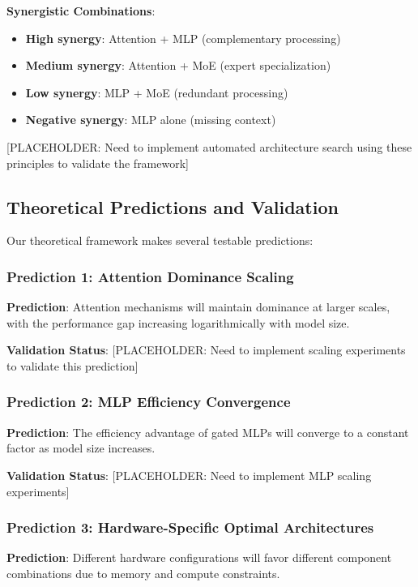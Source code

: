 \documentclass[11pt,a4paper]{article}
\begin{document}
\textbf{Synergistic Combinations}:
\begin{itemize}
    \item \textbf{High synergy}: Attention + MLP (complementary processing)
    \item \textbf{Medium synergy}: Attention + MoE (expert specialization)
    \item \textbf{Low synergy}: MLP + MoE (redundant processing)
    \item \textbf{Negative synergy}: MLP alone (missing context)
\end{itemize}

[PLACEHOLDER: Need to implement automated architecture search using these principles to validate the framework]

\subsection{Theoretical Predictions and Validation}

Our theoretical framework makes several testable predictions:

\subsubsection{Prediction 1: Attention Dominance Scaling}
\textbf{Prediction}: Attention mechanisms will maintain dominance at larger scales, with the performance gap increasing logarithmically with model size.

\textbf{Validation Status}: [PLACEHOLDER: Need to implement scaling experiments to validate this prediction]

\subsubsection{Prediction 2: MLP Efficiency Convergence}
\textbf{Prediction}: The efficiency advantage of gated MLPs will converge to a constant factor as model size increases.

\textbf{Validation Status}: [PLACEHOLDER: Need to implement MLP scaling experiments]

\subsubsection{Prediction 3: Hardware-Specific Optimal Architectures}
\textbf{Prediction}: Different hardware configurations will favor different component combinations due to memory and compute constraints.
\end{document}
